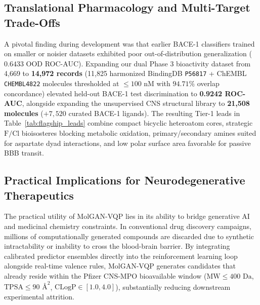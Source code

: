 \documentclass[10pt,a4paper]{article}
\begin{document}
\subsection{Translational Pharmacology and Multi-Target Trade-Offs}
A pivotal finding during development was that earlier BACE-1 classifiers trained on smaller or noisier datasets exhibited poor out-of-distribution generalization ($0.6433$ OOD ROC-AUC). Expanding our dual Phase 3 bioactivity dataset from 4,669 to \textbf{14,972 records} (11,825 harmonized BindingDB \texttt{P56817} + ChEMBL \texttt{CHEMBL4822} molecules thresholded at $\le 100\text{ nM}$ with $94.71\%$ overlap concordance) elevated held-out BACE-1 test discrimination to \textbf{0.9242 ROC-AUC}, alongside expanding the unsupervised CNS structural library to \textbf{21,508 molecules} ($+7,520$ curated BACE-1 ligands). The resulting Tier-1 leads in Table~\ref{tab:flagship_leads} combine compact bicyclic heteroatom cores, strategic $\mathrm{F}/\mathrm{Cl}$ bioisosteres blocking metabolic oxidation, primary/secondary amines suited for aspartate dyad interactions, and low polar surface area favorable for passive BBB transit.

\subsection{Practical Implications for Neurodegenerative Therapeutics}
The practical utility of MolGAN-VQP lies in its ability to bridge generative AI and medicinal chemistry constraints. In conventional drug discovery campaigns, millions of computationally generated compounds are discarded due to synthetic intractability or inability to cross the blood-brain barrier. By integrating calibrated predictor ensembles directly into the reinforcement learning loop alongside real-time valence rules, MolGAN-VQP generates candidates that already reside within the Pfizer CNS-MPO bioavailable window ($\mathrm{MW} \le 400\text{ Da}$, $\mathrm{TPSA} \le 90\text{ \AA}^2$, $\mathrm{CLogP} \in [1.0, 4.0]$), substantially reducing downstream experimental attrition.
\end{document}
